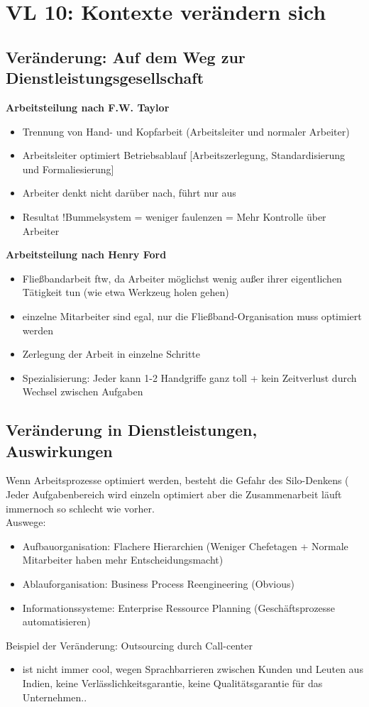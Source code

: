 \newpage
\section{VL 10: Kontexte verändern sich}
\subsection{Veränderung: Auf dem Weg zur Dienstleistungsgesellschaft}
\begin{multicols}{2}
\textbf{Arbeitsteilung nach F.W. Taylor}
\begin{itemize}
\item Trennung von Hand- und Kopfarbeit (Arbeitsleiter und normaler Arbeiter)
\item Arbeitsleiter optimiert Betriebsablauf [Arbeitszerlegung, Standardisierung und Formaliesierung]
\item Arbeiter denkt nicht darüber nach, führt nur aus
\item Resultat $!$Bummelsystem = weniger faulenzen = Mehr Kontrolle über Arbeiter
\end{itemize}

\textbf{Arbeitsteilung nach Henry Ford}
\begin{itemize}
\item Fließbandarbeit ftw, da Arbeiter möglichst wenig außer ihrer eigentlichen Tätigkeit tun (wie etwa Werkzeug holen gehen)
\item einzelne Mitarbeiter sind egal, nur die Fließband-Organisation muss optimiert werden
\item Zerlegung der Arbeit in einzelne Schritte
\item Spezialisierung: Jeder kann 1-2 Handgriffe ganz toll + kein Zeitverlust durch Wechsel zwischen Aufgaben
\end{itemize}
\end{multicols}

\subsection{Veränderung in Dienstleistungen, Auswirkungen}
Wenn Arbeitsprozesse optimiert werden, besteht die Gefahr des Silo-Denkens ( Jeder Aufgabenbereich wird einzeln optimiert aber die Zusammenarbeit läuft immernoch so schlecht wie vorher. \\
Auswege:
\begin{itemize}
\item Aufbauorganisation: Flachere Hierarchien (Weniger Chefetagen + Normale Mitarbeiter haben mehr Entscheidungsmacht)
\item Ablauforganisation: Business Process Reengineering (Obvious)
\item Informationssysteme: Enterprise Ressource Planning (Geschäftsprozesse automatisieren)
\end{itemize}
Beispiel der Veränderung: Outsourcing durch Call-center
\begin{itemize}
\item ist nicht immer cool, wegen Sprachbarrieren zwischen Kunden und Leuten aus Indien, keine Verlässlichkeitsgarantie, keine Qualitätsgarantie für das Unternehmen..
\end{itemize}
